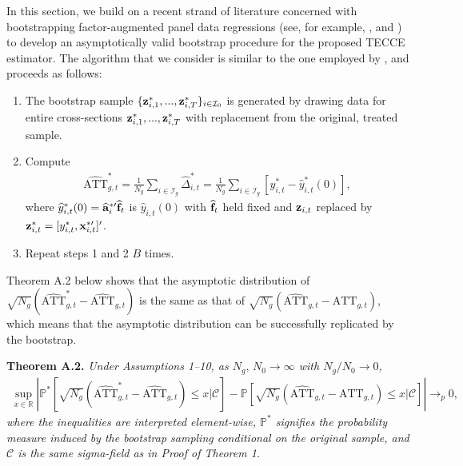 \documentclass[12pt,fleqn]{article}
\begin{document}
In this section, we build on a recent strand of literature concerned with bootstrapping factor-augmented panel data regressions (see, for example,
\citealp{de2024cross}, and \citealp{westerlund2019cce}) to develop an asymptotically valid bootstrap procedure for the proposed TECCE estimator. The algorithm that we consider is similar to the one employed by \citet{westerlund2019cce}, and proceeds as follows:
\begin{enumerate}
  \item The bootstrap sample $\{\mathbf{z}_{i,1}^*,...,\mathbf{z}_{i,T}^*\}_{i \in \mathcal{I}_0}$ is generated by drawing data for entire cross-sections $\mathbf{z}_{i,1}^*,...,\mathbf{z}_{i,T}^*$ with replacement from the original, treated sample.

  \item Compute
\begin{align}
\widehat{\mathrm{ATT}}_{g,t}^* = \frac{1}{N_g}\sum_{i \in \mathcal{I}_g} \widehat \Delta_{i,t}^*= \frac{1}{N_g}\sum_{i \in \mathcal{I}_g} [y_{i,t}^* - \widehat y_{i,t}^*(0)],
\end{align}
  where $\widehat y_{i,t}^*(0) = \widehat{\mathbf{a}}_i^{*\prime}\widehat{\mathbf{f}}_t$ is $\widehat y_{i,t}(0)$ with $\widehat{\mathbf{f}}_t$ held fixed and $\mathbf{z}_{i,t}$ replaced by $\mathbf{z}_{i,t}^* = [y_{i,t}^*,\mathbf{x}_{i,t}^{*\prime}]'$.

  \item Repeat steps 1 and 2 $B$ times.
\end{enumerate}

Theorem A.2 below shows that the asymptotic distribution of $\sqrt{N_g}(\widehat{\mathrm{ATT}}_{g,t}^* - \widehat{\mathrm{ATT}}_{g,t})$ is the same as that of $\sqrt{N_g}(\widehat{\mathrm{ATT}}_{g,t} - \mathrm{ATT}_{g,t})$, which means that the asymptotic distribution can be successfully replicated by the bootstrap.

\bigskip

\noindent \textbf{Theorem A.2.} \emph{Under Assumptions 1--10, as $N_g,\,N_0\to \infty$ with $N_g/N_0\to 0$,}
\begin{eqnarray*}
\sup_{x \in \mathbb{R}} \left|\mathbb{P}^*[\sqrt{N_g}(\widehat{\mathrm{ATT}}_{g,t}^* - \widehat{\mathrm{ATT}}_{g,t}) \leq x|\mathcal{C}] - \mathbb{P}[\sqrt{N_g}(\widehat{\mathrm{ATT}}_{g,t} - \mathrm{ATT}_{g,t})\leq x|\mathcal{C}]\right| \to_p 0,
\end{eqnarray*}
\emph{where the inequalities are interpreted element-wise, $\mathbb{P}^*$ signifies the probability measure induced by the bootstrap sampling conditional on the original sample, and $\mathcal{C}$ is the same sigma-field as in Proof of Theorem 1.}
\end{document}
